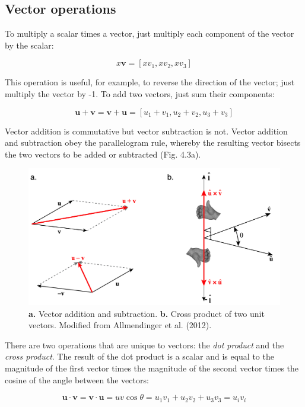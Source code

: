 \documentclass[a4paper , 12pt]{book}
\begin{document}
\subsection{Vector operations}
To multiply a scalar times a vector, just multiply each component of the vector by the scalar:

\begin{equation}
    x\mathbf v=[xv_1,xv_2,xv_3]
\end{equation}

This operation is useful, for example, to reverse the direction of the vector; just multiply the vector by -1.
To add two vectors, just sum their components:

\begin{equation}
    \mathbf u + \mathbf v=\mathbf v+\mathbf u=[u_1+v_1,u_2+v_2,u_3+v_3]
\end{equation}

Vector addition is commutative but vector subtraction is not. Vector addition and subtraction obey the parallelogram rule, whereby the resulting vector bisects the two vectors to be added or subtracted (Fig. 4.3a).

\begin{figure}[ht]
    \centering
    \includegraphics[width=13cm]{Figures/ch4f3.png}
    \caption{\textbf{a.} Vector addition and subtraction. \textbf{b.} Cross product of two unit vectors. Modified from Allmendinger et al. (2012).}
\end{figure}

There are two operations that are unique to vectors: the \textit{dot product} and the \textit{cross product}. The result of the dot product is a scalar and is equal to the magnitude of the first vector times the magnitude of the second vector times the cosine of the angle between the vectors:

\begin{equation}
    \mathbf u \cdot\mathbf v=\mathbf v \cdot\mathbf u=uv\cos\theta=u_1v_1+u_2v_2+u_3v_3=u_iv_i
\end{equation}
\end{document}
